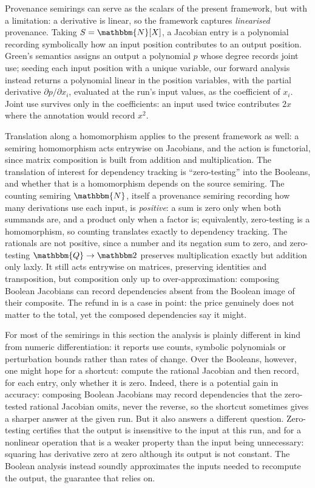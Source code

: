 Provenance semirings can serve as the scalars of the present framework, but with a limitation: a
derivative is linear, so the framework captures \emph{linearised} provenance. Taking $S = \mathbbm{N}[X]$, a
Jacobian entry is a polynomial recording symbolically how an input position contributes to an output position.
Green's semantics assigns an output a polynomial $p$ whose degree records joint use; seeding each input
position with a unique variable, our forward analysis instead returns a polynomial linear in the position
variables, with the partial derivative $\partial p / \partial x_i$, evaluated at the run's input values, as
the coefficient of $x_i$. Joint use survives only in the coefficients: an input
used twice contributes $2x$ where the annotation would record $x^2$.

Translation along a homomorphism applies to the present framework as well: a semiring homomorphism acts
entrywise on Jacobians, and the action is functorial, since matrix composition is built from addition and
multiplication. The translation of interest for dependency tracking is ``zero-testing'' into the Booleans, and
whether that is a homomorphism depends on the source semiring. The counting semiring $\mathbbm{N}$, itself a
provenance semiring recording how many derivations use each input, is \emph{positive}: a sum is zero only when
both summands are, and a product only when a factor is; equivalently, zero-testing is a homomorphism, so
counting translates exactly to dependency tracking. The rationals are not positive, since a number and its
negation sum to zero, and zero-testing $\mathbbm{Q} \to \Two$ preserves multiplication exactly but addition
only laxly. It still acts entrywise on matrices, preserving identities and transposition, but composition only
up to over-approximation: composing Boolean Jacobians can record dependencies absent from the Boolean image of
their composite. The refund in  is a case in point: the price genuinely does not
matter to the total, yet the composed dependencies say it might.

\begin{remark}
  \label{rem:jacobian-translation}
  For most of the semirings in this section the analysis is plainly different in kind from numeric
  differentiation: it reports use counts, symbolic polynomials or perturbation bounds rather than rates of
  change. Over the Booleans, however, one might hope for a shortcut: compute the rational Jacobian and then
  record, for each entry, only whether it is zero. Indeed, there is a potential gain in accuracy: composing
  Boolean Jacobians may record dependencies that the zero-tested rational Jacobian omits, never the reverse,
  so the shortcut sometimes gives a sharper answer at the given run. But it also answers a different
  question. Zero-testing certifies that the output is insensitive to the input at this run, and for a
  nonlinear operation that is a weaker property than the input being unnecessary: squaring has derivative
  zero at zero although its output is not constant. The Boolean analysis instead soundly approximates the
  inputs needed to recompute the output, the guarantee that \GPS relies on.
\end{remark}

